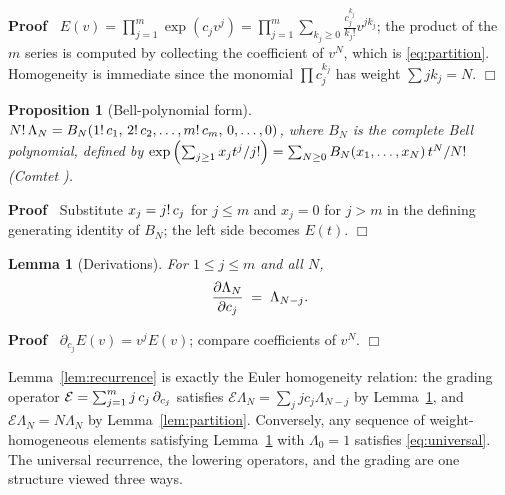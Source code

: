 \documentclass{article}
\newcommand{\tmem}[1]{{\em #1\/}}
\newenvironment{proof}{\noindent\textbf{Proof\ }}{\hspace*{\fill}$\Box$\medskip}
\newtheorem{lemma}{Lemma}
{\theorembodyfont{\rmfamily\small}\newtheorem{problem}{Problem}}
\newtheorem{proposition}{Proposition}
{\theorembodyfont{\rmfamily}\newtheorem{remark}{Remark}}
\begin{document}
\begin{proof}
  $E (v) = \prod_{j = 1}^m \exp (c_j v^j) = \prod_{j = 1}^m \sum_{k_j \ge 0}
  \frac{c_j^{k_j}}{k_j !} v^{jk_j}$; the product of the $m$ series is computed
  by collecting the coefficient of $v^N$, which is \eqref{eq:partition}.
  Homogeneity is immediate since the monomial $\prod c_j^{k_j}$ has weight
  $\sum jk_j = N$.
\end{proof}

\begin{proposition}
  [Bell-polynomial form]\label{prop:bell} $N! \hspace{0.17em} \Lambda_N = B_N 
  (1! \hspace{0.17em} c_1, \hspace{0.17em} 2! \hspace{0.17em} c_2, \ldots, m!
  \hspace{0.17em} c_m, \hspace{0.17em} 0, \ldots, 0)$, where $B_N$ is the
  complete Bell polynomial, defined by $\exp \left( \sum_{j \ge 1} x_j t^j /
  j! \right) = \sum_{N \ge 0} B_N  (x_1, \ldots, x_N)  \hspace{0.17em} t^N /
  N!$ {\tmem{(Comtet {\cite[{\textsection}3.3]{Comtet}})}}.
\end{proposition}

\begin{proof}
  Substitute $x_j = j! \hspace{0.17em} c_j$ for $j \le m$ and $x_j = 0$ for $j
  > m$ in the defining generating identity of $B_N$; the left side becomes $E
  (t)$.
\end{proof}

\begin{lemma}
  [Derivations]\label{lem:derivation} For $1 \le j \le m$ and all $N$,
  \[ \frac{\partial \Lambda_N}{\partial c_j} \hspace{0.27em} = \hspace{0.27em}
     \Lambda_{N - j} . \]
\end{lemma}

\begin{proof}
  $\partial_{c_j} E (v) = v^j E (v)$; compare coefficients of $v^N$.
\end{proof}

\begin{remark}
  \label{rem:eulerequiv}Lemma~\ref{lem:recurrence} is exactly the Euler
  homogeneity relation: the grading operator $\mathcal{E}= \sum_{j = 1}^m j
  \hspace{0.17em} c_j  \hspace{0.17em} \partial_{c_j}$ satisfies $\mathcal{E}
  \Lambda_N = \sum_j jc_j \Lambda_{N - j}$ by Lemma~\ref{lem:derivation}, and
  $\mathcal{E} \Lambda_N = N \Lambda_N$ by Lemma~\ref{lem:partition}.
  Conversely, any sequence of weight-homogeneous elements satisfying
  Lemma~\ref{lem:derivation} with $\Lambda_0 = 1$ satisfies
  \eqref{eq:universal}. The universal recurrence, the lowering operators, and
  the grading are one structure viewed three ways.
\end{remark}
\end{document}

